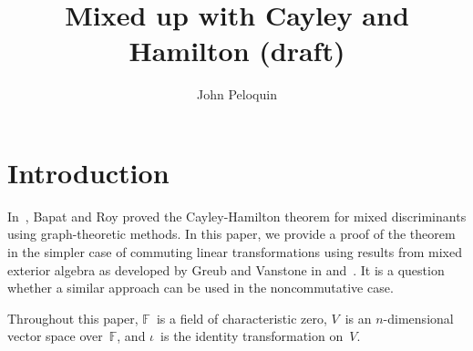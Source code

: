 \documentclass[letterpaper]{article}
\title{Mixed up with Cayley and Hamilton (draft)}
\author{John Peloquin}
\newcommand{\F}{\mathbb{F}}
\theoremstyle{definition}
\theoremstyle{plain}
\begin{document}
\maketitle
\section*{Introduction}
In~\cite{bapatroy}, Bapat and Roy proved the Cayley-Hamilton theorem for mixed discriminants using graph-theoretic methods. In this paper, we provide a proof of the theorem in the simpler case of commuting linear transformations using results from mixed exterior algebra as developed by Greub and Vanstone in \cite{greub} and~\cite{greubvanstone}. It is a question whether a similar approach can be used in the noncommutative case.

Throughout this paper, \(\F\)~is a field of characteristic zero, \(V\)~is an \(n\)-dimensional vector space over~\(\F\), and \(\iota\)~is the identity transformation on~\(V\).
\end{document}
